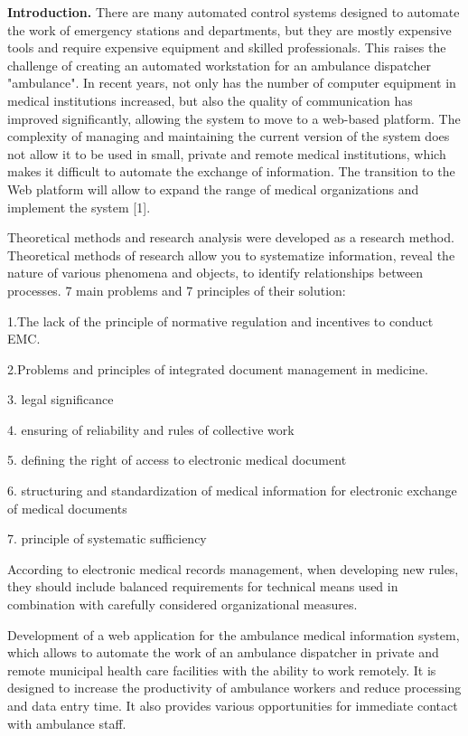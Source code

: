 \begin{multicols}{2}
{\bfseries Introduction.} There are many automated control systems designed
to automate the work of emergency stations and departments, but they are
mostly expensive tools and require expensive equipment and skilled
professionals. This raises the challenge of creating an automated
workstation for an ambulance dispatcher "ambulance". In recent years,
not only has the number of computer equipment in medical institutions
increased, but also the quality of communication has improved
significantly, allowing the system to move to a web-based platform. The
complexity of managing and maintaining the current version of the system
does not allow it to be used in small, private and remote medical
institutions, which makes it difficult to automate the exchange of
information. The transition to the Web platform will allow to expand the
range of medical organizations and implement the system {[}1{]}.

Theoretical methods and research analysis were developed as a research
method. Theoretical methods of research allow you to systematize
information, reveal the nature of various phenomena and objects, to
identify relationships between processes. 7 main problems and 7
principles of their solution:

1.The lack of the principle of normative regulation and incentives to
conduct EMC.

2.Problems and principles of integrated document management in medicine.

3. legal significance

4. ensuring of reliability and rules of collective work

5. defining the right of access to electronic medical document

6. structuring and standardization of medical information for electronic
exchange of medical documents

7. principle of systematic sufficiency

According to electronic medical records management, when developing new
rules, they should include balanced requirements for technical means
used in combination with carefully considered organizational measures.

Development of a web application for the ambulance medical information
system, which allows to automate the work of an ambulance dispatcher in
private and remote municipal health care facilities with the ability to
work remotely. It is designed to increase the productivity of ambulance
workers and reduce processing and data entry time. It also provides
various opportunities for immediate contact with ambulance staff.


\end{multicols}
